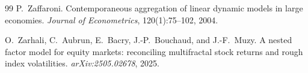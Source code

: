 \documentclass[11pt]{article}
\begin{document}
\begin{thebibliography}{99}
P.~Zaffaroni.
\newblock Contemporaneous aggregation of linear dynamic models in large economies.
\newblock \emph{Journal of Econometrics}, 120(1):75--102, 2004.

O.~Zarhali, C.~Aubrun, E.~Bacry, J.-P.~Bouchaud, and J.-F.~Muzy.
\newblock A nested factor model for equity markets: reconciling multifractal stock returns and rough index volatilities.
\newblock \emph{arXiv:2505.02678}, 2025.

\end{thebibliography}
\end{document}
